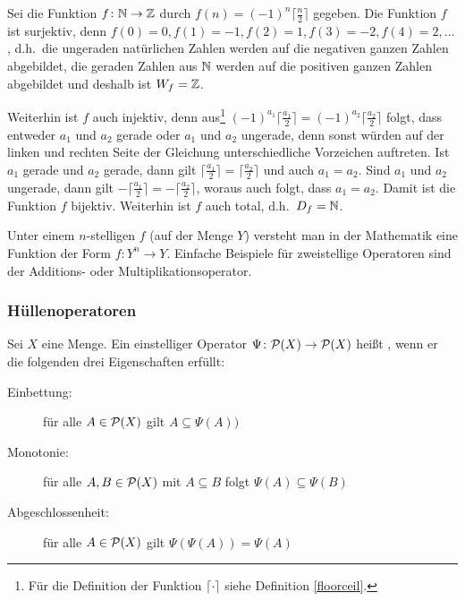 \begin{example}
Sei die Funktion $f \colon \mathbb N \rightarrow \mathbb Z$ durch $f(n) = (-1)^n
\lceil \frac{n}{2} \rceil$ gegeben. Die Funktion $f$ ist surjektiv,
denn $f(0) = 0, f(1) = -1, f(2) = 1, f(3) = -2, f(4) = 2, \dots$, d.h.~die 
ungeraden natürlichen Zahlen werden auf die negativen ganzen Zahlen 
abgebildet, die geraden Zahlen aus $\mathbb N$ werden auf die positiven
ganzen Zahlen abgebildet und deshalb ist $W_f = \mathbb Z$.

Weiterhin ist $f$ auch injektiv, denn aus\footnote{Für die Definition
der Funktion $\lceil \cdot \rceil$ siehe Definition \ref{floorceil}.}
$(-1)^{a_1} \lceil \frac{a_1}{2} \rceil = (-1)^{a_2}
\lceil \frac{a_2}{2} \rceil$ folgt, dass entweder $a_1$ und $a_2$
gerade oder $a_1$ und $a_2$ ungerade, denn sonst würden auf der linken
und rechten Seite der Gleichung unterschiedliche Vorzeichen
auftreten. Ist $a_1$ gerade und $a_2$ gerade, dann gilt
$\lceil \frac{a_1}{2} \rceil = \lceil \frac{a_2}{2} \rceil$ und auch
$a_1 = a_2$. Sind $a_1$ und $a_2$ ungerade, dann gilt
$-\lceil \frac{a_1}{2} \rceil = -\lceil \frac{a_2}{2} \rceil$, woraus
auch folgt, dass $a_1 = a_2$.
%
Damit ist die Funktion $f$ bijektiv. Weiterhin ist $f$ auch total,
d.h.~$D_f = \mathbb N$.
\end{example}

\begin{definition}
Unter einem $n$-stelligen  $f$ (auf der Menge $Y$) versteht man in der Mathematik eine Funktion der Form $f \colon Y^n \rightarrow Y$.  Einfache Beispiele für zweistellige Operatoren sind der Additions- oder Multiplikationsoperator.
\end{definition}

\subsubsection{Hüllenoperatoren}

\begin{definition}
Sei $X$ eine Menge. Ein einstelliger Operator $\Psi \colon \mathcal{P}(X) \rightarrow \mathcal{P}(X)$ heißt , wenn er die folgenden drei Eigenschaften erfüllt:

\begin{description}
%
\item[Einbettung:] für alle $A \in \mathcal{P}(X)$ gilt $A \subseteq \Psi(A))$
%
\item[Monotonie:] für alle $A,B \in \mathcal{P}(X)$ mit $A \subseteq B$ folgt $\Psi(A) \subseteq \Psi(B)$
%
\item[Abgeschlossenheit:] für alle $A \in \mathcal{P}(X)$ gilt $\Psi(\Psi(A)) = \Psi(A)$
%
\end{description}
\end{definition}

